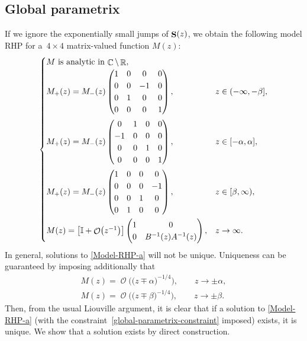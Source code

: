 \documentclass[pdftex]{sigma}
\DeclareMathOperator{\CC}{\mathbb{C}}
\DeclareMathOperator{\RR}{\mathbb{R}}
\DeclareMathOperator{\OO}{\mathcal{O}}
\DeclareMathOperator{\boldS}{{\bf S}}
\numberwithin{equation}{section}
\begin{document}
\subsection{Global parametrix}
If we ignore the exponentially small jumps of $\boldS(z)$, we obtain the following model RHP for a~${4\times 4}$ matrix-valued function $M(z)$:
\begin{equation}\label{Model-RHP-a}
 \begin{cases}
 \text{$M$ is analytic in $\CC\setminus\RR$},\\
 M_+(z) = M_-(z)
 \begin{pmatrix}
 1 & 0 & 0 & 0\\
 0 & 0 & -1 & 0\\
 0 & 1 & 0 & 0\\
 0 & 0 & 0 & 1\\
 \end{pmatrix}, & z \in (-\infty,-\beta],\vspace{1mm}\\
 M_+(z) = M_-(z)
 \begin{pmatrix}
 0 & 1 & 0 & 0\\
 -1 & 0 & 0 & 0\\
 0 & 0 & 1 & 0\\
 0 & 0 & 0 & 1\\
 \end{pmatrix}, & z \in [-\alpha,\alpha],\vspace{1mm}\\
 M_+(z) = M_-(z)
 \begin{pmatrix}
 1 & 0 & 0 & 0\\
 0 & 0 & 0 & -1\\
 0 & 0 & 1 & 0\\
 0 & 1 & 0 & 0\\
 \end{pmatrix}, & z \in [\beta,\infty),\vspace{1mm}\\
 M(z) =
 \bigl[\mathbb{I} + \OO\bigl(z^{-1}\bigr)\bigr]
 \begin{pmatrix}
 1 & 0\\
 0 & B^{-1}(z) A^{-1}(z)
 \end{pmatrix},
 & z \to \infty.
 \end{cases}
\end{equation}
In general, solutions to \eqref{Model-RHP-a} will not be unique. Uniqueness can be guaranteed by imposing additionally that
\begin{gather}
 M(z) = \OO\bigl( \bigl(z\mp \alpha\bigr)^{-1/4} \bigr), \qquad z\to \pm \alpha,\nonumber\\
 M(z) = \OO\bigl( \bigl(z\mp \beta\bigr)^{-1/4} \bigr), \qquad z\to \pm \beta.\label{global-parametrix-constraint}
\end{gather}
Then, from the usual Liouville argument, it is clear that if a solution to \eqref{Model-RHP-a} (with the constraint~\eqref{global-parametrix-constraint} imposed) exists, it is unique. We show that a solution exists by direct construction.
\end{document}
